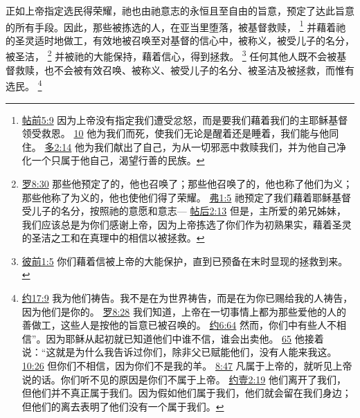 \documentclass[12pt, a4paper, oneside]{ctexart}
\newcounter{parnum}[section]
\newcommand{\N}{%
   \noindent\refstepcounter{parnum}%
    \makebox[\parindent][l]{\textbf{\arabic{parnum}.}}}
\begin{document}
\N 正如上帝指定选民得荣耀，祂也由祂意志的永恒且至自由的旨意，预定了达此旨意的所有手段。因此，那些被拣选的人，在亚当里堕落，被基督救赎，
	\footnote {
		\href{https://biblehub.com/1_thessalonians/5-9.htm}{帖前5:9} 因为上帝没有指定我们遭受忿怒，而是要我们藉着我们的主耶稣基督领受救恩。
		\href{https://biblehub.com/1_thessalonians/5-10.htm}{10} 他为我们而死，使我们无论是醒着还是睡着，我们能与他同住。
		\href{https://biblehub.com/titus/2-14.htm}{多2:14} 他为我们献出了自己，为从一切邪恶中救赎我们，并为他自己净化一个只属于他自己，渴望行善的民族。
	}
	并藉着祂的圣灵适时地做工，有效地被召唤至对基督的信心中，被称义，被受儿子的名分，被圣洁，
	\footnote {
		\href{https://biblehub.com/romans/8-30.htm}{罗8:30} 那些他预定了的，他也召唤了；那些他召唤了的，他也称了他们为义；那些他称了为义的，他也使他们得了荣耀。
		\href{https://biblehub.com/ephesians/1-5.htm}{弗1:5} 祂预定了我们藉着耶稣基督受儿子的名分，按照祂的意愿和意志---
		\href{https://biblehub.com/2_thessalonians/2-13.htm}{帖后2:13} 但是，主所爱的弟兄姊妹，我们应该总是为你们感谢上帝，因为上帝拣选了你们作为初熟果实，藉着圣灵的圣洁之工和在真理中的相信以被拯救。
	}
	并被祂的大能保持，藉着信心，得到拯救。
	\footnote {
		\href{https://biblehub.com/1_peter/1-5.htm}{彼前1:5} 你们藉着信被上帝的大能保护，直到已预备在末时显现的拯救到来。
	}
	任何其他人既不会被基督救赎，也不会被有效召唤、被称义、被受儿子的名分、被圣洁及被拯救，而惟有选民。
	\footnote {
		\href{https://biblehub.com/john/17-9.htm}{约17:9} 我为他们祷告。我不是在为世界祷告，而是在为你已赐给我的人祷告，因为他们是你的。
		\href{https://biblehub.com/romans/8-28.htm}{罗8:28} 我们知道，上帝在一切事情上都为那些爱他的人的善做工，这些人是按他的旨意已被召唤的。
		\href{https://biblehub.com/john/6-64.htm}{约6:64} 然而，你们中有些人不相信”。因为耶稣从起初就已知道他们中谁不信，谁会出卖他。
		\href{https://biblehub.com/john/6-65.htm}{65} 他接着说：“这就是为什么我告诉过你们，除非父已赋能他们，没有人能来我这。
		\href{https://biblehub.com/john/10-26.htm}{10:26} 但你们不相信，因为你们不是我的羊。
		\href{https://biblehub.com/john/8-47.htm}{8:47} 凡属于上帝的，就听见上帝说的话。你们听不见的原因是你们不属于上帝。
		\href{https://biblehub.com/1_john/2-19.htm}{约壹2:19} 他们离开了我们，但他们并不真正属于我们。因为假如他们属于我们，他们就会留在我们身边；但他们的离去表明了他们没有一个属于我们。
	}
\end{document}
